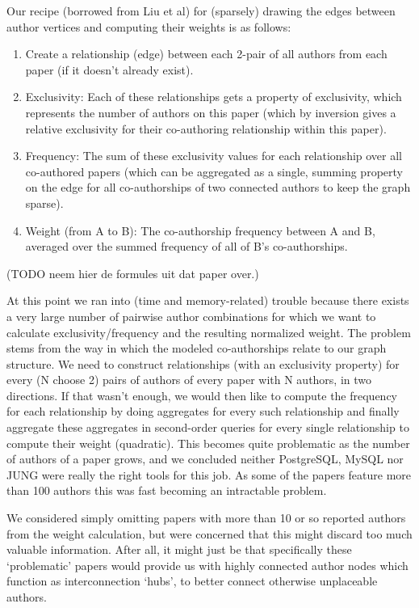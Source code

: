 Our recipe (borrowed from Liu et al) for (sparsely) drawing the edges between author vertices and computing their weights is as follows:


\begin{enumerate}



  \item Create a relationship (edge) between each 2-pair of all authors from each paper (if it doesn’t already exist).
  \item Exclusivity: Each of these relationships gets a property of exclusivity, which represents the number of authors on this paper (which by inversion gives a relative exclusivity for their co-authoring relationship within this paper).
  \item Frequency: The sum of these exclusivity values for each relationship over all co-authored papers (which can be aggregated as a single, summing property on the edge for all co-authorships of two connected authors to keep the graph sparse).
  \item Weight (from A to B): The co-authorship frequency between A and B, averaged over the summed frequency of all of B’s co-authorships.

\end{enumerate}
(TODO neem hier de formules uit dat paper over.)

At this point we ran into (time and memory-related) trouble because there exists a very large number of pairwise author combinations for which we want to calculate exclusivity/frequency and the resulting normalized weight. The problem stems from the way in which the modeled co-authorships relate to our graph structure. We need to construct relationships (with an exclusivity property) for every (N choose 2) pairs of authors of every paper with N authors, in two directions. If that wasn’t enough, we would then like to compute the frequency for each relationship by doing aggregates for every such relationship and finally aggregate these aggregates in second-order queries for every single relationship to compute their weight (quadratic).
This becomes quite problematic as the number of authors of a paper grows, and we concluded neither PostgreSQL, MySQL nor JUNG were really the right tools for this job.
As some of the papers feature more than 100 authors this was fast becoming an intractable problem.

We considered simply omitting papers with more than 10 or so reported authors from the weight calculation, but were concerned that this might discard too much valuable information. After all, it might just be that specifically these `problematic’ papers would provide us with highly connected author nodes which function as interconnection `hubs’, to better connect otherwise unplaceable authors.

